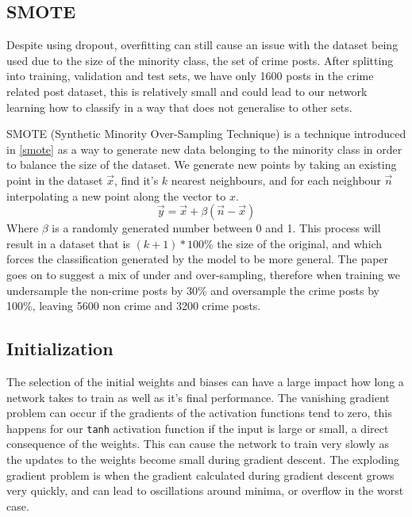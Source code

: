 \documentclass[12pt,a4paper,twoside,openright]{report}
\begin{document}
\subsection{SMOTE}
Despite using dropout, overfitting can still cause an issue with the dataset being used due to the size of the minority class, the set of crime posts. After splitting into training, validation and test sets, we have only 1600 posts in the crime related post dataset, this is relatively small and could lead to our network learning how to classify in a way that does not generalise to other sets.
\newline
  
SMOTE (Synthetic Minority Over-Sampling Technique) is a technique introduced in \ref{smote} as a way to generate new data belonging to the minority class in order to balance the size of the dataset. We generate new points by taking an existing point in the dataset $\Vec{x}$, find it's $k$ nearest neighbours, and for each neighbour $\Vec{n}$ interpolating a new point along the vector to $x$.
\begin{equation}
    \Vec{y} = \Vec{x} + \beta(\Vec{n} - \Vec{x})
\end{equation}
Where $\beta$ is a randomly generated number between 0 and 1. This process will result in a dataset that is $(k+1) * 100\%$ the size of the original, and which forces the classification generated by the model to be more general. The paper goes on to suggest a mix of under and over-sampling, therefore when training we undersample the non-crime posts by 30\% and oversample the crime posts by 100\%, leaving 5600 non crime and 3200 crime posts.   

\subsection{Initialization}
The selection of the initial weights and biases can have a large impact how long a network takes to train as well as it's final performance. The vanishing gradient problem can occur if the gradients of the activation functions tend to zero, this happens for our \texttt{tanh} activation function if the input is large or small, a direct consequence of the weights. This can cause the network to train very slowly as the updates to the weights become small during gradient descent. The exploding gradient problem is when the gradient calculated during gradient descent grows very quickly, and can lead to oscillations around minima, or overflow in the worst case. 
\newline
 
\end{document}
